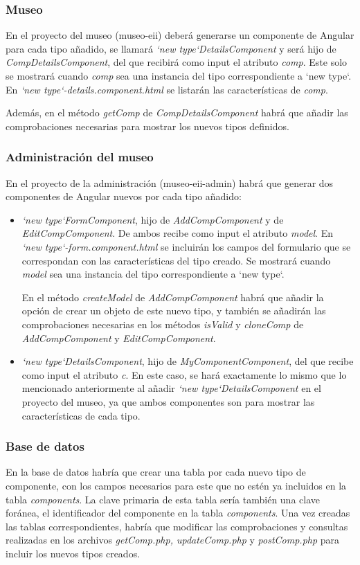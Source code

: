 \subsubsection{Museo}
En el proyecto del museo (museo-eii) deberá generarse un componente de Angular para cada tipo añadido, se llamará \textit{`new type`DetailsComponent} y será hijo de \textit{CompDetailsComponent}, del que recibirá como input el atributo \textit{comp}. Este solo se mostrará cuando \textit{comp} sea una instancia del tipo correspondiente a `new type`. En \textit{`new type`-details.component.html} se listarán las características de \textit{comp}.\par
Además, en el método \textit{getComp} de \textit{CompDetailsComponent} habrá que añadir las comprobaciones necesarias para mostrar los nuevos tipos definidos.

\subsubsection{Administración del museo}
En el proyecto de la administración (museo-eii-admin) habrá que generar dos componentes de Angular nuevos por cada tipo añadido: 
\begin{itemize}
\item \textit{`new type`FormComponent}, hijo de \textit{AddCompComponent} y de \textit{EditCompComponent}. De ambos recibe como input el atributo \textit{model}. En \textit{`new type`-form.component.html} se incluirán los campos del formulario que se correspondan con las características del tipo creado. Se mostrará cuando \textit{model} sea una instancia del tipo correspondiente a `new type`. \par
En el método \textit{createModel} de \textit{AddCompComponent} habrá que añadir la opción de crear un objeto de este nuevo tipo, y también se añadirán las comprobaciones necesarias en los métodos \textit{isValid} y \textit{cloneComp} de \textit{AddCompComponent} y \textit{EditCompComponent}.
\item \textit{`new type`DetailsComponent}, hijo de \textit{MyComponentComponent}, del que recibe como input el atributo \textit{c}. En este caso, se hará exactamente lo mismo que lo mencionado anteriormente al añadir \textit{`new type`DetailsComponent} en el proyecto del museo, ya que ambos componentes son para mostrar las características de cada tipo.
\end{itemize}

\subsubsection{Base de datos}
En la base de datos habría que crear una tabla por cada nuevo tipo de componente, con los campos necesarios para este que no estén ya incluidos en la tabla \textit{components}. La clave primaria de esta tabla sería también una clave foránea, el identificador del componente en la tabla \textit{components}. Una vez creadas las tablas correspondientes, habría que modificar las comprobaciones y consultas realizadas en los archivos \textit{getComp.php, updateComp.php} y \textit{postComp.php} para incluir los nuevos tipos creados.




